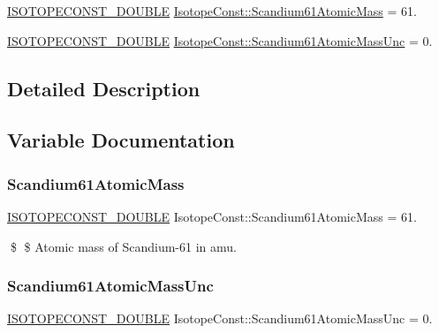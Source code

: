 \begin{DoxyCompactItemize}
\item 
\mbox{\hyperlink{group___isotope_const-_macros_ga8f45a7272ce02c0b4c65c44636ed719a}{I\+S\+O\+T\+O\+P\+E\+C\+O\+N\+S\+T\+\_\+\+D\+O\+U\+B\+LE}} \mbox{\hyperlink{group___isotope_const-_scandium-_sc61_ga4179ef88b97ed121aaefb6b1f731e9fb}{Isotope\+Const\+::\+Scandium61\+Atomic\+Mass}} = 61.
\item 
\mbox{\hyperlink{group___isotope_const-_macros_ga8f45a7272ce02c0b4c65c44636ed719a}{I\+S\+O\+T\+O\+P\+E\+C\+O\+N\+S\+T\+\_\+\+D\+O\+U\+B\+LE}} \mbox{\hyperlink{group___isotope_const-_scandium-_sc61_ga42cf7bb7ddd51d2ecb98ab319da99704}{Isotope\+Const\+::\+Scandium61\+Atomic\+Mass\+Unc}} = 0.
\end{DoxyCompactItemize}


\subsection{Detailed Description}


\subsection{Variable Documentation}
\mbox{\label{group___isotope_const-_scandium-_sc61_ga4179ef88b97ed121aaefb6b1f731e9fb}} 
\subsubsection{\texorpdfstring{Scandium61\+Atomic\+Mass}{Scandium61AtomicMass}}
{\footnotesize\ttfamily \mbox{\hyperlink{group___isotope_const-_macros_ga8f45a7272ce02c0b4c65c44636ed719a}{I\+S\+O\+T\+O\+P\+E\+C\+O\+N\+S\+T\+\_\+\+D\+O\+U\+B\+LE}} Isotope\+Const\+::\+Scandium61\+Atomic\+Mass = 61.}

\$ \$ Atomic mass of Scandium-\/61 in amu. \mbox{\label{group___isotope_const-_scandium-_sc61_ga42cf7bb7ddd51d2ecb98ab319da99704}} 
\subsubsection{\texorpdfstring{Scandium61\+Atomic\+Mass\+Unc}{Scandium61AtomicMassUnc}}
{\footnotesize\ttfamily \mbox{\hyperlink{group___isotope_const-_macros_ga8f45a7272ce02c0b4c65c44636ed719a}{I\+S\+O\+T\+O\+P\+E\+C\+O\+N\+S\+T\+\_\+\+D\+O\+U\+B\+LE}} Isotope\+Const\+::\+Scandium61\+Atomic\+Mass\+Unc = 0.}

